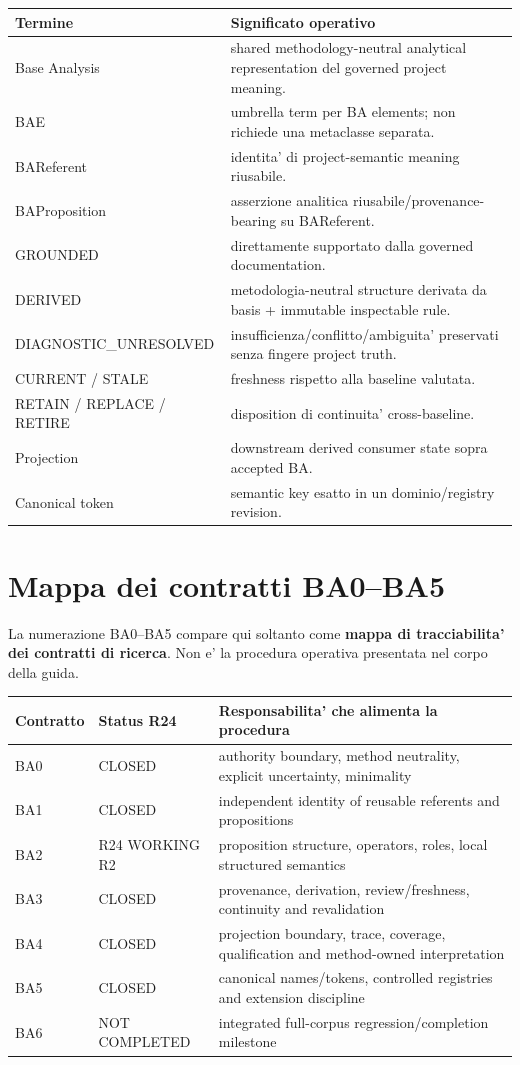 \documentclass[11pt,a4paper]{article}
\begin{document}
\begin{longtable}{L{0.34\textwidth}L{0.53\textwidth}}
\toprule
\textbf{Termine} & \textbf{Significato operativo} \\
\midrule\endhead
Base Analysis & shared methodology-neutral analytical representation del governed project meaning. \\
BAE & umbrella term per BA elements; non richiede una metaclasse separata. \\
BAReferent & identita' di project-semantic meaning riusabile. \\
BAProposition & asserzione analitica riusabile/provenance-bearing su BAReferent. \\
GROUNDED & direttamente supportato dalla governed documentation. \\
DERIVED & metodologia-neutral structure derivata da basis + immutable inspectable rule. \\
DIAGNOSTIC\_UNRESOLVED & insufficienza/conflitto/ambiguita' preservati senza fingere project truth. \\
CURRENT / STALE & freshness rispetto alla baseline valutata. \\
RETAIN / REPLACE / RETIRE & disposition di continuita' cross-baseline. \\
Projection & downstream derived consumer state sopra accepted BA. \\
Canonical token & semantic key esatto in un dominio/registry revision. \\
\bottomrule
\end{longtable}


\appendix
\section{Mappa dei contratti BA0--BA5}
La numerazione BA0--BA5 compare qui soltanto come \textbf{mappa di tracciabilita' dei contratti di ricerca}. Non e' la procedura operativa presentata nel corpo della guida.

\begin{longtable}{L{0.12\textwidth}L{0.24\textwidth}L{0.53\textwidth}}
\toprule
\textbf{Contratto} & \textbf{Status R24} & \textbf{Responsabilita' che alimenta la procedura} \\
\midrule\endhead
BA0 & CLOSED & authority boundary, method neutrality, explicit uncertainty, minimality \\
BA1 & CLOSED & independent identity of reusable referents and propositions \\
BA2 & R24 WORKING R2 & proposition structure, operators, roles, local structured semantics \\
BA3 & CLOSED & provenance, derivation, review/freshness, continuity and revalidation \\
BA4 & CLOSED & projection boundary, trace, coverage, qualification and method-owned interpretation \\
BA5 & CLOSED & canonical names/tokens, controlled registries and extension discipline \\
BA6 & NOT COMPLETED & integrated full-corpus regression/completion milestone \\
\bottomrule
\end{longtable}
\end{document}

